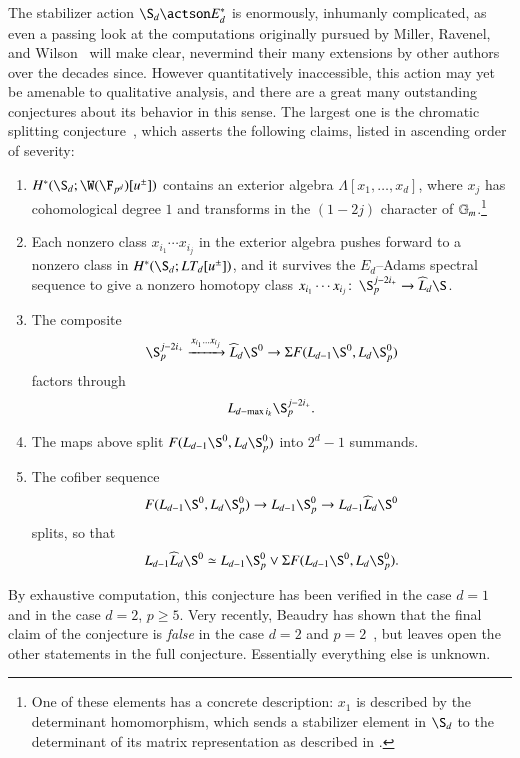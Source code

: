 The stabilizer action $\S_d \actson E_d^*$ is enormously, inhumanly complicated, as even a passing look at the computations originally pursued by Miller, Ravenel, and Wilson~\cite{MRW} will make clear, nevermind their many extensions by other authors over the decades since.  However quantitatively inaccessible, this action may yet be amenable to qualitative analysis, and there are a great many outstanding conjectures about its behavior in this sense.  The largest one is the chromatic splitting conjecture~\cite[Conjecture 4.2]{HoveyCSC}, which asserts the following claims, listed in ascending order of severity:
\begin{enumerate}
    \item $H^*(\S_d; \W(\F_{p^d})[u^\pm])$ contains an exterior algebra $\Lambda[x_1, \ldots, x_d]$, where $x_j$ has cohomological degree $1$ and transforms in the $(1 - 2j)${\th} character of $\mathbb G_m$.\footnote{One of these elements has a concrete description: $x_1$ is described by the determinant homomorphism, which sends a stabilizer element in $\S_d$ to the determinant of its matrix representation as described in .}
    \item Each nonzero class $x_{i_1} \cdots x_{i_j}$ in the exterior algebra pushes forward to a nonzero class in $H^*(\S_d; LT_d[u^\pm])$, and it survives the $E_d$--Adams spectral sequence to give a nonzero homotopy class $x_{i_1} \cdots x_{i_j}\co \S_p^{j-2i_+} \to \widehat L_d \S$.
    \item The composite \[\S_p^{j-2i_+} \xrightarrow{x_{i_1} \ldots x_{i_j}} \widehat L_d \S^0 \to \Susp F(L_{d-1} \S^0, L_d \S_p^0)\] factors through \[L_{d - \max i_k} \S_p^{j-2i_+}.\]
    \item The maps above split $F(L_{d-1} \S^0, L_d \S^0_p)$ into $2^d-1$ summands.
    \item The cofiber sequence \[F(L_{d-1} \S^0, L_d \S^0_p) \to L_{d-1} \S^0_p \to L_{d-1} \widehat L_d \S^0\] splits, so that \[L_{d-1} \widehat L_d \S^0 \simeq L_{d-1} \S^0_p \vee \Susp F(L_{d-1} \S^0, L_d \S^0_p).\]
\end{enumerate}
By exhaustive computation, this conjecture has been verified in the case $d = 1$ and in the case $d = 2$, $p \ge 5$.  Very recently, Beaudry has shown that the final claim of the conjecture is \emph{false} in the case $d = 2$ and $p = 2$~\cite{Beaudry}, but leaves open the other statements in the full conjecture.  Essentially everything else is unknown.

